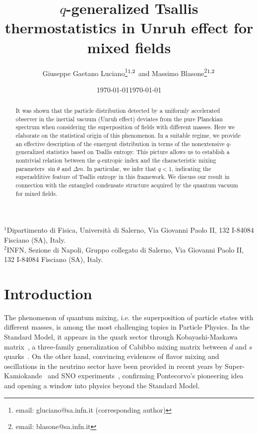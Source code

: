 \documentclass[floats,prd,aps,amssymb,nofootinbib,showkeys]{revtex4}
\begin{document}
\title{$q$-generalized Tsallis thermostatistics in Unruh effect for mixed fields}

\author{Giuseppe Gaetano Luciano\footnote{email: gluciano@sa.infn.it (corresponding author)}$^{\hspace{0.1mm}1,2}$ and Massimo Blasone\footnote{email: blasone@sa.infn.it}$^{\hspace{0.1mm}1,2}$} 
\affiliation
{$^1$Dipartimento di Fisica, Universit\`a di Salerno, Via Giovanni Paolo II, 132 I-84084 Fisciano (SA), Italy.\\ 
$^2$INFN, Sezione di Napoli, Gruppo collegato di Salerno, Via Giovanni Paolo II, 132 I-84084 Fisciano (SA), Italy.}


\date{\today}

\begin{abstract}
It was shown that the particle distribution detected
by a uniformly accelerated observer in the inertial vacuum (Unruh effect)
deviates from the pure Planckian spectrum 
when considering the superposition of fields with different masses. 
Here we elaborate on the statistical origin of this phenomenon. 
In a suitable regime, we provide an effective description of
the emergent distribution in terms of the nonextensive $q$-generalized statistics based on Tsallis entropy. This picture allows us to establish a nontrivial relation between the $q$-entropic index and the characteristic mixing parameters $\sin\theta$ and $\Delta m$. In particular, we infer that $q<1$, indicating the superadditive feature of Tsallis entropy in this framework. We discuss our result in connection with the entangled condensate structure acquired by the
quantum vacuum for mixed fields. 
\end{abstract}


\date{\today}

\maketitle

\section{Introduction}
The phenomenon of quantum mixing, i.e. the superposition
of particle states with different masses, is among the most challenging topics in Particle Physics. In the Standard Model, it appears in the quark sector through Kobayashi-Maskawa matrix~\cite{KM}, 
a three-family generalization of Cabibbo mixing matrix 
between $d$ and $s$ quarks~\cite{Cabi}. On the other hand, 
convincing evidences of flavor mixing and oscillations in the neutrino sector have been
provided in recent years by Super-Kamiokande~\cite{SKK} 
and SNO experiments~\cite{SNO}, confirming
Pontecorvo's pioneering idea~\cite{Pont} and opening
a window into physics beyond the Standard Model. 
\end{document}
